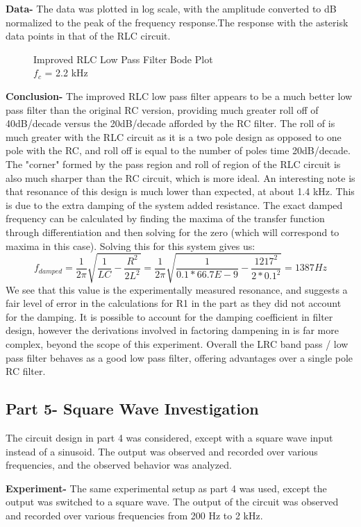 \documentclass[12pt]{article}
\begin{document}
\textbf{Data-} The data was plotted in log scale, with the amplitude converted to dB normalized to the peak of the frequency response.The response with the asterisk data points in that of the RLC circuit.
\FloatBarrier
\begin{figure}[h!]
\begin{center}
    	\resizebox{0.6\textwidth}{!}{}
\end{center}
\caption{Improved RLC Low Pass Filter Bode Plot \\ $f_c$ = 2.2 kHz}
\end{figure}
\FloatBarrier
\textbf{Conclusion-} The improved RLC low pass filter appears to be a much better low pass filter than the original RC version, providing much greater roll off of 40dB/decade versus the 20dB/decade afforded by the RC filter. The roll of is much greater with the RLC circuit as it is a two pole design as opposed to one pole with the RC, and roll off is equal to the number of poles time 20dB/decade. The "corner" formed by the pass region and roll of region of the RLC circuit is also much sharper than the RC circuit, which is more ideal. An interesting note is that resonance of this design is much lower than expected, at about 1.4 kHz. This is due to the extra damping of the system added resistance. The exact damped frequency can be calculated by finding the maxima of the transfer function through differentiation and then solving for the zero (which will correspond to maxima in this case). Solving this for this system gives us:
\begin{equation}
f_{damped} = \frac{1}{2\pi}\sqrt{\frac{1}{LC}-\frac{R^2}{2L^2}} = \frac{1}{2\pi}\sqrt{\frac{1}{0.1\ast 66.7E-9}-\frac{1217^2}{2\ast 0.1^2}} = 1387 Hz
\end{equation}
We see that this value is the experimentally measured resonance, and suggests a fair level of error in the calculations for R1 in the part as they did not account for the damping. It is possible to account for the damping coefficient in filter design, however the derivations involved in factoring dampening in is far more complex, beyond the scope of this experiment. Overall the LRC band pass / low pass filter behaves as a good low pass filter, offering advantages over a single pole RC filter.
\subsection*{Part 5- Square Wave Investigation}
The circuit design in part 4 was considered, except with a square wave input instead of a sinusoid. The output was observed and recorded over various frequencies, and the observed behavior was analyzed.\\\par 
\textbf{Experiment-} The same experimental setup as part 4 was used, except the output was switched to a square  wave. The output of the circuit was observed and recorded over various frequencies from 200 Hz to 2 kHz.\\\par 
\end{document}
